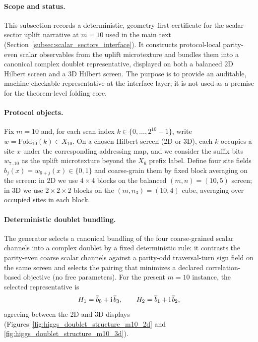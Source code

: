 \paragraph{Scope and status.}
\AuditTag This subsection records a deterministic, geometry-first certificate for the scalar-sector uplift narrative at $m=10$ used in the main text (Section~\ref{subsec:scalar_sectors_interface}).
It constructs protocol-local parity-even scalar observables from the uplift microtexture and bundles them into a canonical complex doublet representative, displayed on both a balanced $2$D Hilbert screen and a $3$D Hilbert screen.
The purpose is to provide an auditable, machine-checkable representative at the interface layer; it is not used as a premise for the theorem-level folding core.

\paragraph{Protocol objects.}
\AuditTag Fix $m=10$ and, for each scan index $k\in\{0,\dots,2^{10}-1\}$, write
$w=\mathrm{Fold}_{10}(k)\in X_{10}$.
On a chosen Hilbert screen (2D or 3D), each $k$ occupies a site $x$ under the corresponding addressing map, and we consider the suffix bits
$w_{7..10}$ as the uplift microtexture beyond the $X_6$ prefix label.
Define four site fields $b_j(x)=w_{6+j}(x)\in\{0,1\}$ and coarse-grain them by fixed block averaging on the screen:
in 2D we use $4\times 4$ blocks on the balanced $(m,n)=(10,5)$ screen; in 3D we use $2\times 2\times 2$ blocks on the $(m,n_3)=(10,4)$ cube, averaging over occupied sites in each block.

\paragraph{Deterministic doublet bundling.}
\AuditTag The generator selects a canonical bundling of the four coarse-grained scalar channels into a complex doublet by a fixed deterministic rule:
it contrasts the parity-even coarse scalar channels against a parity-odd traversal-turn sign field on the same screen and selects the pairing that minimizes a declared correlation-based objective (no free parameters).
For the present $m=10$ instance, the selected representative is
\[
H_1=\overline b_0+\mathrm{i}\,\overline b_3,
\qquad
H_2=\overline b_1+\mathrm{i}\,\overline b_2,
\]
agreeing between the 2D and 3D displays (Figures~\ref{fig:higgs_doublet_structure_m10_2d} and \ref{fig:higgs_doublet_structure_m10_3d}).

